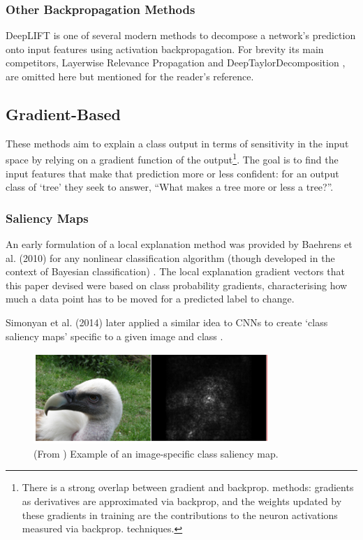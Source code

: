\documentclass[main]{subfiles}
\begin{document}
\subsubsection{Other Backpropagation Methods}
DeepLIFT is one of several modern methods to decompose a network's prediction onto input features using activation backpropagation. For brevity its main competitors, Layerwise Relevance Propagation \cite{lrp} and DeepTaylorDecomposition \cite{taylor}, are omitted here but mentioned for the reader's reference.


\subsection{Gradient-Based} \label{sec:gradient}
These methods aim to explain a class output in terms of sensitivity in the input space by relying on a gradient function of the output\footnote{There is a strong overlap between gradient and backprop. methods: gradients as derivatives are approximated via backprop, and the weights updated by these gradients in training are the contributions to the neuron activations measured via backprop. techniques.}. The goal is to find the input features that make that prediction more or less confident: for an output class of `tree' they seek to answer, ``What makes a tree more or less a tree?''.

\subsubsection{Saliency Maps}
An early formulation of a local explanation method was provided by Baehrens et al. (2010) for any nonlinear classification algorithm (though developed in the context of Bayesian classification) \cite{saliencyI}. The local explanation gradient vectors that this paper devised were based on class probability gradients, characterising how much a data point has to be moved for a predicted label to change.

Simonyan et al. (2014) later applied a similar idea to CNNs to create `class saliency maps' specific to a given image and class \cite{saliencyII}. 

\begin{figure}[h]
\centering
\includegraphics[scale=0.8]{saliency.png}
\caption{(From \cite{saliencyII}) Example of an image-specific class saliency map.}
\label{saliencyimg}
\end{figure}
\end{document}
